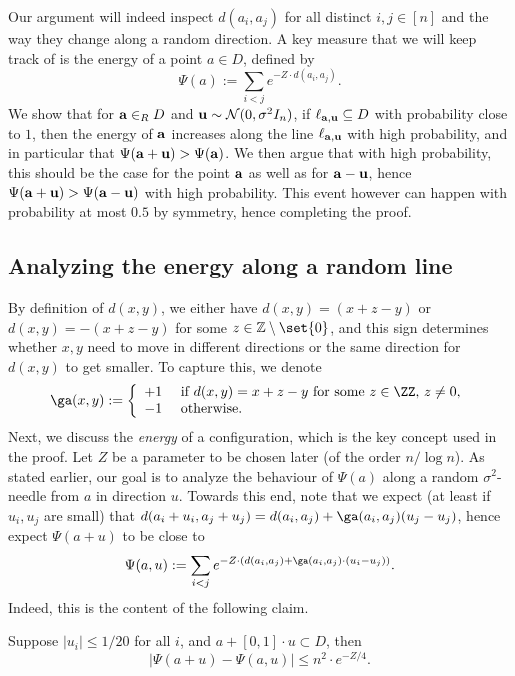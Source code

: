 Our argument will indeed inspect $d(a_i,a_j)$ for all distinct $i,j\in[n]$ and the way they change along a random direction.
A key measure that we will keep track of is the energy of a point $a\in D$, defined by
\begin{equation*}
\Psi(a):= \sum_{i<j} e^{-Z \cdot d(a_i,a_j)}.
\end{equation*}
We show that for ${\bf a}\in_R D$ and ${\bf u}\sim \mathcal{N}(0,\sigma^2 I_n)$, if $\ell_{{\bf a}, {\bf u}}\subseteq D$ with
probability close to $1$, then the energy of ${\bf a}$ increases along the line $\ell_{{\bf a},{\bf u}}$ with high probability, and
in particular that $\Psi({\bf a}+{\bf u}) > \Psi({\bf a})$. We then argue that with high probability, this should be the case for
the point ${\bf a}$ as well as for ${\bf a} - {\bf u}$, hence $\Psi({\bf a}+{\bf u}) > \Psi({\bf a}-{\bf u})$ with high probability.
This event however can happen with probability at most $0.5$ by symmetry, hence completing the proof.


\subsection{Analyzing the energy along a random line}
By definition of $d(x,y)$, we either have $d(x,y) = (x+z-y)$ or $d(x,y) = -(x+z-y)$ for some $z\in\mathbb{Z}\setminus\set{0}$,
and this sign determines whether $x,y$ need to move in different directions or the same direction for $d(x,y)$ to get smaller.
To capture this, we denote
\[
\ga(x,y):=\left\{ \begin{array}{ll}
+1 & \text{ if $d(x,y)=x+z-y$ for some $z\in\ZZ$, $z\neq 0$},\\
-1 & \text{ otherwise}.	
\end{array} \right.
\]
Next, we discuss the {\em energy} of a configuration, which is the key concept used in the proof.
Let $Z$ be a parameter to be chosen later (of the order $n/\log n$).
As stated earlier, our goal is to analyze the behaviour of $\Psi(a)$ along a random $\sigma^2$-needle from $a$
in direction $u$. Towards this end, note that we expect (at least if $u_i, u_j$ are small) that $d(a_i+u_i, a_j+u_j) = d(a_i,a_j) + \ga(a_i,a_j) (u_j-u_j)$,
hence expect $\Psi(a+u)$ to be close to
\begin{equation*}
\Psi(a,u):=  \sum_{i<j} e^{-Z \cdot (d(a_i,a_j)+\ga(a_i,a_j)\cdot (u_i-u_j))}.
\end{equation*}
Indeed, this is the content of the following claim.

\begin{claim}
	\label{cl:1}
	Suppose $|u_i|\leq 1/20$ for all $i$, and $a+[0,1]\cdot u \subset D$, then
	$$
	|\Psi(a+u)-\Psi(a,u)|\leq n^2\cdot e^{-Z/4}.
	$$
\end{claim}

